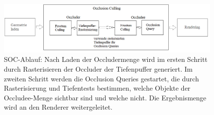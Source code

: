 \documentclass[journal]{vgtc}
\begin{document}
\begin{figure}%
	\includegraphics[width=\columnwidth]{images/SOCAblauf3.png}%
	\caption{SOC-Ablauf: Nach Laden der Occludermenge wird im ersten Schritt durch Rasterisieren der Occluder der Tiefenpuffer generiert. Im zweiten Schritt werden die Occlusion Queries gestartet, die durch Rasterisierung und Tiefentests bestimmen, welche Objekte der Occludee-Menge sichtbar sind und welche nicht. Die Ergebnismenge wird an den Renderer weitergeleitet.}%
	\label{fig:socablauf}%
\end{figure}
\end{document}
